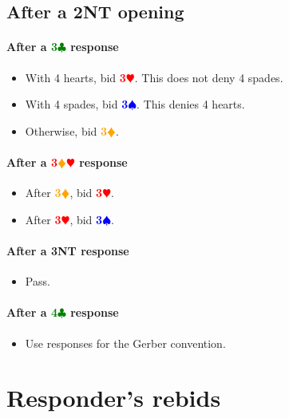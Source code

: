 \documentclass{article}
\newcommand{\Hs}{\textcolor{Red}{$\varheart$}}
\newcommand{\Ss}{\textcolor{Blue}{$\spadesuit$}}
\newcommand{\Ds}{\textcolor{Orange}{$\vardiamond$}}
\newcommand{\Cs}{\textcolor{Green}{$\clubsuit$}}
\newcommand{\NTs}{\textbf{\footnotesize{NT}}}
\renewcommand{\H}[1]{\textcolor{Red}{\textbf{#1}\Hs}}
\renewcommand{\S}[1]{\textcolor{Blue}{\textbf{#1}\Ss}}
\newcommand{\D}[1]{\textcolor{Orange}{\textbf{#1}\Ds}}
\newcommand{\C}[1]{\textcolor{Green}{\textbf{#1}\Cs}}
\newcommand{\NT}[1]{\textbf{#1\NTs}}
\newcommand{\reds}[1]{\textcolor{Red}{\textbf{#1}}\Ds\Hs}
\begin{document}
\subsection{After a \NT{2} opening}

\paragraph{After a \C{3} response}

\begin{itemize}
\item With 4 hearts, bid \H{3}. This does not deny 4 spades.
\item With 4 spades, bid \S{3}. This denies 4 hearts.
\item Otherwise, bid \D{3}.
\end{itemize}

\paragraph{After a \reds{3} response}

\begin{itemize}
\item After \D{3}, bid \H{3}.
\item After \H{3}, bid \S{3}.
\end{itemize}

\paragraph{After a \NT{3} response}

\begin{itemize}
\item Pass.
\end{itemize}

\paragraph{After a \C{4} response}

\begin{itemize}
\item Use responses for the Gerber convention.
\end{itemize}

\section{Responder's rebids}

\end{document}
